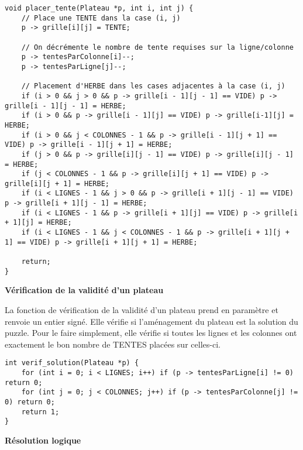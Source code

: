 \documentclass{article}
\begin{document}
\begin{lstlisting}[style=Cstyle]
void placer_tente(Plateau *p, int i, int j) {
    // Place une TENTE dans la case (i, j)
    p -> grille[i][j] = TENTE;

    // On décrémente le nombre de tente requises sur la ligne/colonne
    p -> tentesParColonne[i]--;
    p -> tentesParLigne[j]--;

    // Placement d'HERBE dans les cases adjacentes à la case (i, j)
    if (i > 0 && j > 0 && p -> grille[i - 1][j - 1] == VIDE) p -> grille[i - 1][j - 1] = HERBE;
    if (i > 0 && p -> grille[i - 1][j] == VIDE) p -> grille[i-1][j] = HERBE;
    if (i > 0 && j < COLONNES - 1 && p -> grille[i - 1][j + 1] == VIDE) p -> grille[i - 1][j + 1] = HERBE;
    if (j > 0 && p -> grille[i][j - 1] == VIDE) p -> grille[i][j - 1] = HERBE;
    if (j < COLONNES - 1 && p -> grille[i][j + 1] == VIDE) p -> grille[i][j + 1] = HERBE;
    if (i < LIGNES - 1 && j > 0 && p -> grille[i + 1][j - 1] == VIDE) p -> grille[i + 1][j - 1] = HERBE;
    if (i < LIGNES - 1 && p -> grille[i + 1][j] == VIDE) p -> grille[i + 1][j] = HERBE;
    if (i < LIGNES - 1 && j < COLONNES - 1 && p -> grille[i + 1][j + 1] == VIDE) p -> grille[i + 1][j + 1] = HERBE;

    return;
}
\end{lstlisting}

\textbf{Vérification de la validité d'un plateau}

    La fonction de vérification de la validité d'un plateau prend en paramètre et renvoie un entier signé. Elle vérifie si l'aménagement du plateau est la solution du puzzle. Pour le faire simplement, elle vérifie si toutes les lignes et les colonnes ont exactement le bon nombre de TENTES placées sur celles-ci.
    
\begin{lstlisting}[style=Cstyle]
int verif_solution(Plateau *p) {
    for (int i = 0; i < LIGNES; i++) if (p -> tentesParLigne[i] != 0) return 0;
    for (int j = 0; j < COLONNES; j++) if (p -> tentesParColonne[j] != 0) return 0;
    return 1;
}
\end{lstlisting}

\textbf{Résolution logique}
\end{document}
